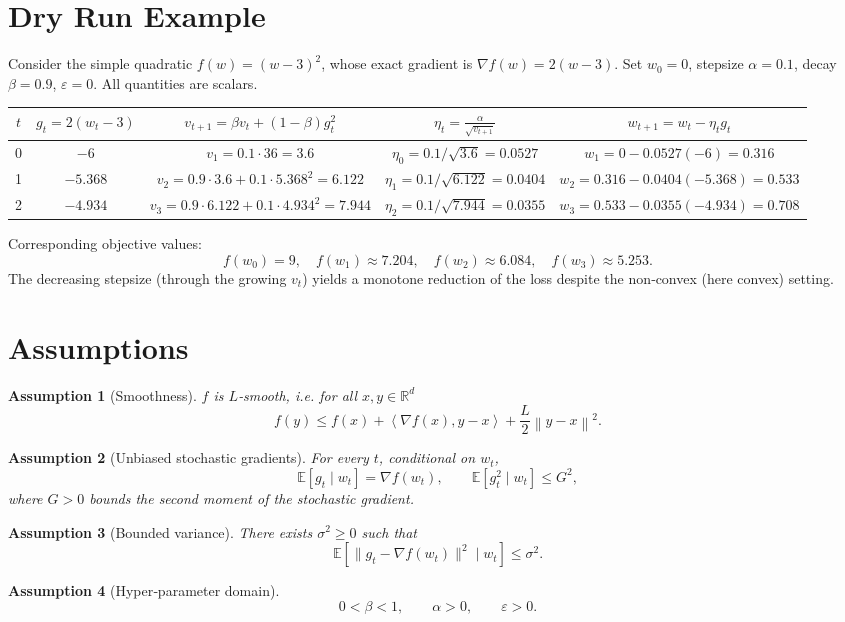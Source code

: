 \documentclass{article}
\newtheorem{assumption}{Assumption}
\newcommand{\E}{\mathbb{E}}
\newcommand{\R}{\mathbb{R}}
\newcommand{\norm}[1]{\left\lVert #1 \right\rVert}
\newcommand{\ip}[2]{\left\langle #1,#2 \right\rangle}
\begin{document}
\section*{Dry Run Example}
Consider the simple quadratic $f(w)=(w-3)^{2}$, whose exact gradient is
$\nabla f(w)=2(w-3)$.  
Set $w_{0}=0$, stepsize $\alpha=0.1$, decay $\beta=0.9$, $\varepsilon=0$.
All quantities are scalars.

\begin{center}
\begin{tabular}{c|c|c|c|c}
$t$ & $g_{t}=2(w_{t}-3)$ & $v_{t+1}= \beta v_{t}+(1-\beta)g_{t}^{2}$ & $\displaystyle \eta_{t}= \frac{\alpha}{\sqrt{v_{t+1}}}$ & $w_{t+1}=w_{t}-\eta_{t}g_{t}$ \\ \hline
0 & $-6$ & $v_{1}=0.1\cdot36=3.6$ & $\eta_{0}=0.1/\sqrt{3.6}=0.0527$ & $w_{1}=0-0.0527(-6)=0.316$ \\ 
1 & $-5.368$ & $v_{2}=0.9\cdot3.6+0.1\cdot5.368^{2}=6.122$ & $\eta_{1}=0.1/\sqrt{6.122}=0.0404$ & $w_{2}=0.316-0.0404(-5.368)=0.533$ \\ 
2 & $-4.934$ & $v_{3}=0.9\cdot6.122+0.1\cdot4.934^{2}=7.944$ & $\eta_{2}=0.1/\sqrt{7.944}=0.0355$ & $w_{3}=0.533-0.0355(-4.934)=0.708$ 
\end{tabular}
\end{center}

Corresponding objective values:
\[
f(w_{0})=9,\quad f(w_{1})\approx7.204,\quad f(w_{2})\approx6.084,\quad f(w_{3})\approx5.253 .
\]
The decreasing stepsize (through the growing $v_{t}$) yields a
monotone reduction of the loss despite the non‑convex (here convex) setting.

\newpage
\section*{Assumptions}
\begin{assumption}[Smoothness]\label{ass:smooth}
$f$ is $L$‑smooth, i.e. for all $x,y\in\R^{d}$
\[
f(y)\le f(x)+\ip{\nabla f(x)}{y-x}+\frac{L}{2}\norm{y-x}^{2}.
\tag{3}
\]
\end{assumption}
\begin{assumption}[Unbiased stochastic gradients]\label{ass:unbiased}
For every $t$, conditional on $w_{t}$,
\[
\E\!\left[g_{t}\mid w_{t}\right]=\nabla f(w_{t}),\qquad
\E\!\left[g_{t}^{2}\mid w_{t}\right]\le G^{2},
\tag{4}
\]
where $G>0$ bounds the second moment of the stochastic gradient.
\end{assumption}
\begin{assumption}[Bounded variance]\label{ass:var}
There exists $\sigma^{2}\ge0$ such that
\[
\E\!\left[\bigl\|g_{t}-\nabla f(w_{t})\bigr\|^{2}\mid w_{t}\right]\le \sigma^{2}.
\tag{5}
\]
\end{assumption}
\begin{assumption}[Hyper‑parameter domain]\label{ass:hyper}
\[
0<\beta<1,\qquad \alpha>0,\qquad \varepsilon>0.
\tag{6}
\]
\end{assumption}
\end{document}
